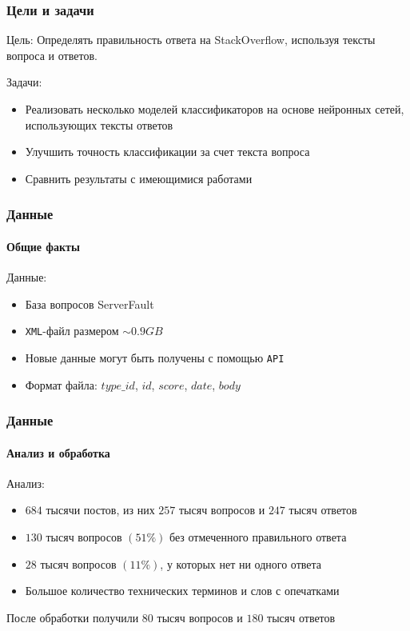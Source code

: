 \documentclass[10pt]{beamer}
\begin{document}

\begin{frame}
\frametitle{Цели и задачи}

Цель: Определять правильность ответа на StackOverflow, используя тексты вопроса и ответов.

\medskip

Задачи:
\begin{itemize}
	\item Реализовать несколько моделей классификаторов на основе нейронных сетей, использующих тексты ответов
	\item Улучшить точность классификации за счет текста вопроса
	\item Сравнить результаты с имеющимися работами
\end{itemize}


\end{frame}


\begin{frame}
\frametitle{Данные}
\framesubtitle{Общие факты}

Данные:

\begin{itemize}
	\item База вопросов ServerFault
	\item \texttt{XML}-файл размером $\sim0.9GB$
	\item Новые данные могут быть получены с помощью \texttt{API}
	\item Формат файла: $type\_id$, $id$, $score$, $date$, $body$
\end{itemize}

\end{frame}


\begin{frame}
\frametitle{Данные}
\framesubtitle{Анализ и обработка}

Анализ:

\begin{itemize}
	\item $684$ тысячи постов, из них $257$ тысяч вопросов и $247$ тысяч ответов
	\item $130$ тысяч вопросов $(51\%)$ без отмеченного правильного ответа
	\item $28$ тысяч вопросов $(11\%)$, у которых нет ни одного ответа
	\item Большое количество технических терминов и слов с опечатками
\end{itemize}

После обработки получили $80$ тысяч вопросов и $180$ тысяч ответов

\end{frame}
\end{document}

